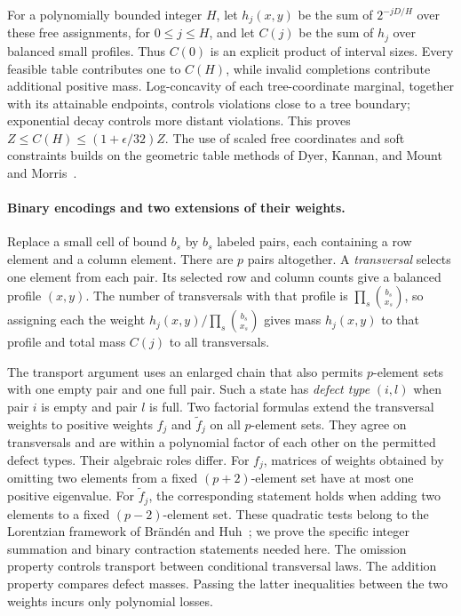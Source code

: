 For a polynomially bounded integer $H$, let $h_j(x,y)$ be the sum of
$2^{-jD/H}$ over these free assignments, for $0\le j\le H$, and
let $C(j)$ be the sum of $h_j$ over balanced small profiles. Thus
$C(0)$ is an explicit product of interval sizes. Every feasible table
contributes one to $C(H)$, while invalid completions contribute
additional positive mass. Log-concavity of each tree-coordinate marginal,
together with its attainable endpoints, controls violations close to
a tree boundary; exponential decay controls more distant violations.
This proves $Z\le C(H)\le(1+\epsilon/32)Z$. The use of scaled free
coordinates and soft constraints builds on the geometric table methods
of Dyer, Kannan, and Mount and Morris~\cite{DKM1997,Morris2002}.

\paragraph{Binary encodings and two extensions of their weights.}
Replace a small cell of bound $b_s$ by $b_s$ labeled pairs, each
containing a row element and a column element. There are $p$ pairs
altogether. A \emph{transversal} selects one element from each pair.
Its selected row and column counts give a balanced profile $(x,y)$.
The number of transversals with that profile is
$\prod_s\binom{b_s}{x_s}$, so assigning each the weight
$h_j(x,y)/\prod_s\binom{b_s}{x_s}$ gives mass $h_j(x,y)$ to that
profile and total mass $C(j)$ to all transversals.

The transport argument uses an enlarged chain that also permits $p$-element sets
with one empty pair and one full pair. Such a state has \emph{defect
type} $(i,l)$ when pair $i$ is empty and pair $l$ is full.
Two factorial formulas extend the transversal weights to positive
weights $f_j$ and $\widetilde f_j$ on all $p$-element sets. They
agree on transversals and are within a polynomial factor of each other
on the permitted defect types. Their algebraic roles differ. For $f_j$,
matrices of weights obtained by omitting two elements from a fixed
$(p+2)$-element set have at most one positive eigenvalue. For
$\widetilde f_j$, the corresponding statement holds when adding two
elements to a fixed $(p-2)$-element set. These quadratic tests
belong to the Lorentzian framework of Br\"and\'en and
Huh~\cite{BH2020}; we prove the specific integer summation and binary
contraction statements needed here. The omission property controls
transport between conditional transversal laws. The addition property
compares defect masses. Passing the latter inequalities between the
two weights incurs only polynomial losses.

